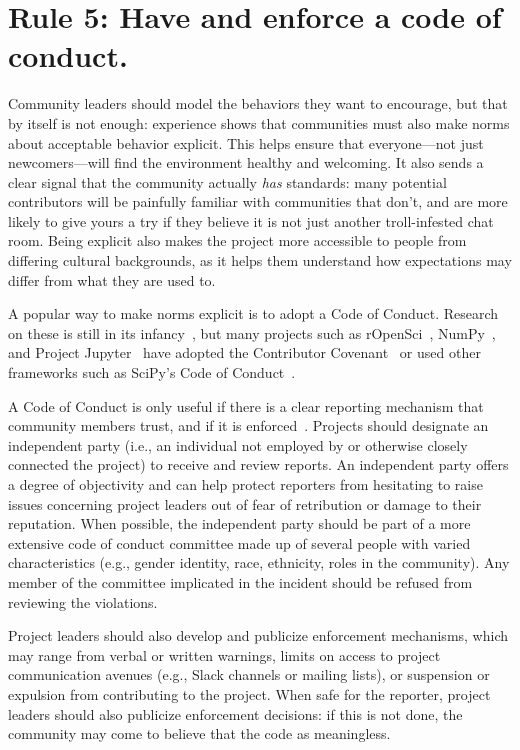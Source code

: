 \documentclass[10pt,letterpaper]{article}
\newcommand{\rulemajor}[1]{\section*{#1}}
\begin{document}
\rulemajor{Rule 5: Have and enforce a code of conduct.}

Community leaders should model the behaviors they want to encourage,
but that by itself is not enough:
experience shows that communities must also make norms about acceptable behavior explicit.
This helps ensure that everyone---not just newcomers---will find the environment healthy and welcoming.
It also sends a clear signal that the community actually \textit{has} standards:
many potential contributors will be painfully familiar with communities that don't,
and are more likely to give yours a try if they believe
it is not just another troll-infested chat room.
Being explicit also makes the project more accessible to people from differing cultural backgrounds,
as it helps them understand how expectations may differ from what they are used to.

A popular way to make norms explicit is to adopt a Code of Conduct.
Research on these is still in its infancy~\cite{tourani2017},
but many projects such as rOpenSci~\cite{ropensci-coc},
NumPy~\cite{numpy-coc},
and Project Jupyter~\cite{jupyter-coc}
have adopted the Contributor Covenant~\cite{covenant}
or used other frameworks such as SciPy's Code of Conduct~\cite{scipy-coc}.

A Code of Conduct is only useful if there is a clear reporting mechanism that community members trust,
and if it is enforced~\cite{aurora2019}.
Projects should designate an independent party
(i.e., an individual not employed by or otherwise closely connected the project)
to receive and review reports.
An independent party offers a degree of objectivity
and can help protect reporters from hesitating to raise issues concerning project leaders
out of fear of retribution or damage to their reputation.
When possible,
the independent party should be part of a more extensive code of conduct committee
made up of several people with varied characteristics
(e.g., gender identity, race, ethnicity, roles in the community).
Any member of the committee implicated in the incident should be refused from reviewing the violations.

Project leaders should also develop and publicize enforcement mechanisms,
which may range from verbal or written warnings,
limits on access to project communication avenues (e.g., Slack channels or mailing lists),
or suspension or expulsion from contributing to the project.
When safe for the reporter,
project leaders should also publicize enforcement decisions:
if this is not done,
the community may come to believe that the code as meaningless.
\end{document}
